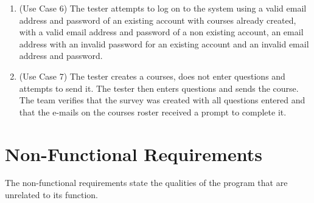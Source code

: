 \documentclass{article}
\begin{document}
\begin{enumerate}
  \item (Use Case 6) The tester attempts to log on to the system using a valid email address and password of an existing account with courses already created, with a valid email address and password of a non existing account, an email address with an invalid password for an existing account and an invalid email address and password.
  \item (Use Case 7) The tester creates a courses, does not enter questions and attempts to send it.  The tester then enters questions and sends the course.  The team verifies that the survey was created with all questions entered and that the e-mails on the courses roster received a prompt to complete it. 
  
\end{enumerate}

\newpage
\section{Non-Functional Requirements}

The non-functional requirements state the qualities of the program that are unrelated to its function.
\end{document}
